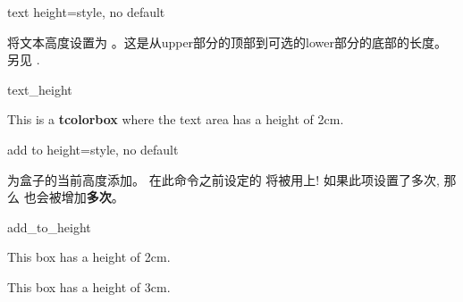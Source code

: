 \begin{docTcbKey}[][doc new=2014-10-31]{text height}{=}{style, no default}

将文本高度设置为 。这是从upper部分的顶部到可选的lower部分的底部的长度。另见 .


\begin{exdispExample}{text_height}

\begin{tcolorbox}[text height=2cm]
This is a \textbf{tcolorbox} where the text area has a height of 2cm.
\end{tcolorbox}
\end{exdispExample}
\end{docTcbKey}





\begin{docTcbKey}[][doc new=2014-11-07]{add to height}{=}{style, no default}

为盒子的当前高度添加。%
在此命令之前设定的  将被用上!%
如果此项设置了多次, 那么  也会被增加{\bf 多次}。
\begin{exdispExample}{add_to_height}

\begin{tcolorbox}
  This box has a height of 2cm.
\end{tcolorbox}
\begin{tcolorbox}[add to height=1cm]
  This box has a height of 3cm.
\end{tcolorbox}
\end{exdispExample}
\end{docTcbKey}


